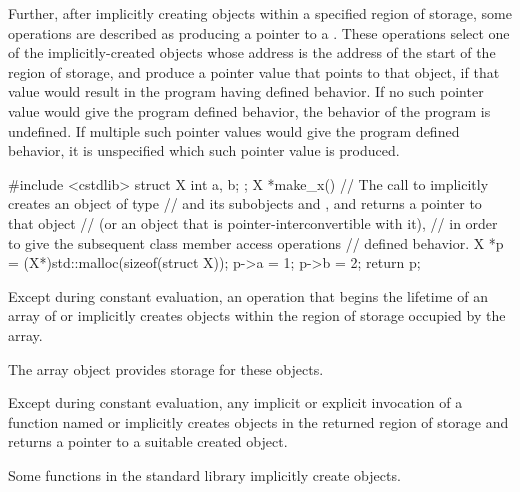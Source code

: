\pnum
Further, after implicitly creating objects within a specified region of storage,
some operations are described as producing a pointer to a
.
These operations select one of the implicitly-created objects
whose address is the address of the start of the region of storage,
and produce a pointer value that points to that object,
if that value would result in the program having defined behavior.
If no such pointer value would give the program defined behavior,
the behavior of the program is undefined.
%
%
%
%
%
If multiple such pointer values would give the program defined behavior,
it is unspecified which such pointer value is produced.

\pnum
\begin{example}
\begin{codeblock}
#include <cstdlib>
struct X { int a, b; };
X *make_x() {
  // The call to  implicitly creates an object of type 
  // and its subobjects  and , and returns a pointer to that  object
  // (or an object that is pointer-interconvertible with it),
  // in order to give the subsequent class member access operations
  // defined behavior.
  X *p = (X*)std::malloc(sizeof(struct X));
  p->a = 1;
  p->b = 2;
  return p;
}
\end{codeblock}
\end{example}

\pnum
Except during constant evaluation,
an operation that begins the lifetime of
an array of  or 
implicitly creates objects within the region of storage occupied by the array.
\begin{note}
The array object provides storage for these objects.
\end{note}
Except during constant evaluation,
any implicit or explicit invocation of a function
named  or 
implicitly creates objects in the returned region of storage and
returns a pointer to a suitable created object.
\begin{note}
Some functions in the \Cpp{} standard library implicitly create
objects.
\end{note}

